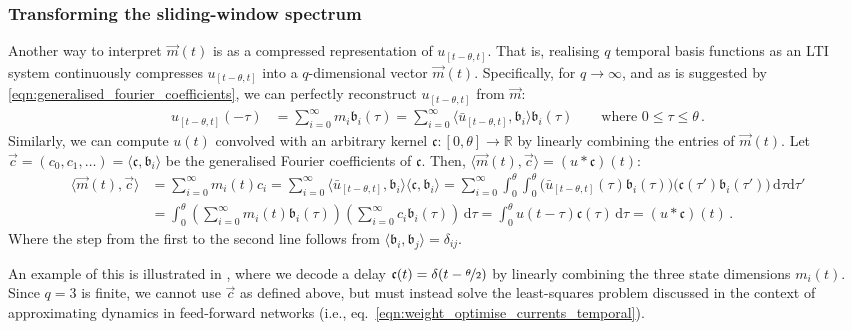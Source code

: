\subsubsection{Transforming the sliding-window spectrum}
Another way to interpret $\vec m(t)$ is as a compressed representation of $u_{[t - \theta, t]}$.
That is, realising $q$ temporal basis functions as an LTI system continuously compresses $u_{[t - \theta, t]}$ into a $q$-dimensional vector $\vec m(t)$.
Specifically, for $q \to \infty$, and as is suggested by \cref{eqn:generalised_fourier_coefficients}, we can perfectly reconstruct $u_{[t - \theta, t]}$ from $\vec m$:
\begin{align*}
	u_{[t - \theta, t]}(-\tau) &= \sum_{i = 0}^\infty m_i \mathfrak{b}_i(\tau) = \sum_{i = 0}^\infty \langle \bar u_{[t - \theta, t]}, \mathfrak{b}_i \rangle \mathfrak{b}_i(\tau) \quad\quad \text{where } 0 \leq \tau \leq \theta \,.
\end{align*}
Similarly, we can compute $u(t)$ convolved with an arbitrary kernel $\mathfrak{c} : [0, \theta] \longrightarrow \mathbb{R}$ by linearly combining the entries of $\vec m(t)$.
Let $\vec{c} = (c_0, c_1, \ldots) = \langle \mathfrak{c}, \mathfrak{b}_i \rangle$ be the generalised Fourier coefficients of $\mathfrak{c}$.
Then, $\langle \vec m(t), \vec{c} \rangle = (u \ast \mathfrak{c})(t)$:
\begin{align*}
	\langle \vec m(t), \vec{c} \rangle
		&= \sum_{i = 0}^\infty m_i(t) c_i
		 = \sum_{i = 0}^\infty \langle \bar u_{[t - \theta, t]}, \mathfrak{b}_i \rangle \langle \mathfrak{c}, \mathfrak{b}_i \rangle 
		 = \sum_{i = 0}^\infty \int_0^\theta \!\! \int_0^\theta \!\!
		 	\bigl( \bar u_{[t - \theta, t]}(\tau) \mathfrak{b}_i(\tau) \bigr)
		 	\bigl( \mathfrak{c}(\tau') \mathfrak{b}_i(\tau') \bigr) \,\mathrm{d}\tau \mathrm{d}\tau' \\
		&= \int_0^\theta \!\!
			\left(\sum\nolimits_{i = 0}^\infty m_i(t) \mathfrak{b}_i(\tau) \right)
			\left(\sum\nolimits_{i = 0}^\infty c_i \mathfrak{b}_i(\tau) \right) \,\mathrm{d}{\tau}
		 = \int_0^\theta \!\! u(t - \tau) \mathfrak{c}(\tau) \,\mathrm{d}{\tau}
		 = (u \ast \mathfrak{c})(t) \,.
\end{align*}
Where the step from the first to the second line follows from $\langle \mathfrak{b}_i, \mathfrak{b}_j \rangle = \delta_{ij}$.

An example of this is illustrated in , where we decode a delay $\mathfrak{c}(t) = \delta(t - \nicefrac{\theta}2)$ by linearly combining the three state dimensions $m_i(t)$.
Since $q = 3$ is finite, we cannot use $\vec c$ as defined above, but must instead solve the least-squares problem discussed in the context of approximating dynamics in feed-forward networks (i.e., eq.~\ref{eqn:weight_optimise_currents_temporal}).

